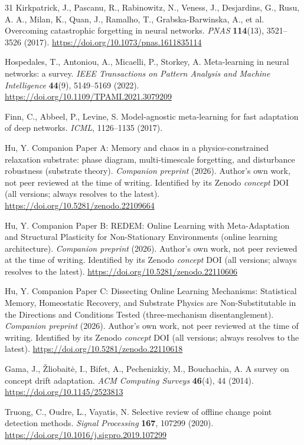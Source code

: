 \documentclass[preprint,12pt]{elsarticle}
\begin{document}
\begin{thebibliography}{31}
 Kirkpatrick, J., Pascanu, R., Rabinowitz, N.,
Veness, J., Desjardins, G., Rusu, A. A., Milan, K., Quan, J., Ramalho, T.,
Grabska-Barwinska, A., et al. Overcoming catastrophic forgetting in
neural networks. \emph{PNAS} \textbf{114}(13), 3521--3526 (2017).
\url{https://doi.org/10.1073/pnas.1611835114}

 Hospedales, T., Antoniou, A., Micaelli, P.,
Storkey, A. Meta-learning in neural networks: a survey. \emph{IEEE
Transactions on Pattern Analysis and Machine Intelligence} \textbf{44}(9),
5149--5169 (2022). \url{https://doi.org/10.1109/TPAMI.2021.3079209}

 Finn, C., Abbeel, P., Levine, S. Model-agnostic
meta-learning for fast adaptation of deep networks. \emph{ICML},
1126--1135 (2017).

 Hu, Y. Companion Paper A: Memory and chaos in a
physics-constrained relaxation substrate: phase diagram, multi-timescale
forgetting, and disturbance robustness (substrate theory).
\emph{Companion preprint} (2026). Author's own work, not peer reviewed at the
time of writing. Identified by its Zenodo \emph{concept} DOI (all versions;
always resolves to the latest).
\url{https://doi.org/10.5281/zenodo.22109664}

 Hu, Y. Companion Paper B: REDEM: Online Learning
with Meta-Adaptation and Structural Plasticity for Non-Stationary
Environments (online learning architecture). \emph{Companion preprint}
(2026). Author's own work, not peer reviewed at the time of writing.
Identified by its Zenodo \emph{concept} DOI (all versions; always resolves
to the latest).
\url{https://doi.org/10.5281/zenodo.22110606}

 Hu, Y. Companion Paper C: Dissecting Online
Learning Mechanisms: Statistical Memory, Homeostatic Recovery, and
Substrate Physics are Non-Substitutable in the Directions and Conditions
Tested (three-mechanism disentanglement). \emph{Companion preprint}
(2026). Author's own work, not peer reviewed at the time of writing.
Identified by its Zenodo \emph{concept} DOI (all versions; always resolves
to the latest).
\url{https://doi.org/10.5281/zenodo.22110618}

 Gama, J., \v{Z}liobait\.e, I., Bifet, A., Pechenizkiy, M.,
Bouchachia, A. A survey on concept drift adaptation. \emph{ACM Computing
Surveys} \textbf{46}(4), 44 (2014).
\url{https://doi.org/10.1145/2523813}

 Truong, C., Oudre, L., Vayatis, N. Selective review of
offline change point detection methods. \emph{Signal Processing}
\textbf{167}, 107299 (2020).
\url{https://doi.org/10.1016/j.sigpro.2019.107299}


\end{thebibliography}
\end{document}
